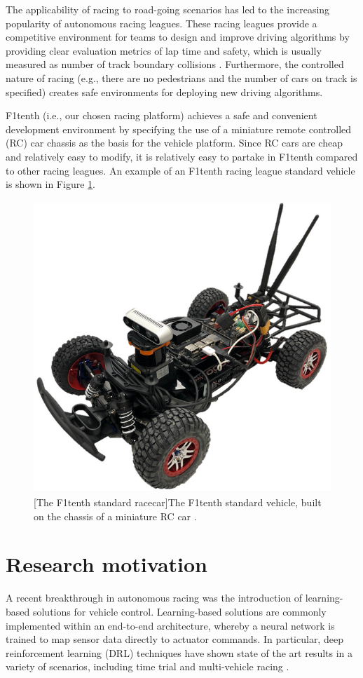 The applicability of racing to road-going scenarios has led to the increasing popularity of autonomous racing leagues.
These racing leagues provide a competitive environment for teams to design and improve driving algorithms by providing clear evaluation metrics of lap time and safety, which is usually measured as number of track boundary collisions \cite{Betz2021}. 
Furthermore, the controlled nature of racing (e.g., there are no pedestrians and the number of cars on track is specified) creates safe environments for deploying new driving algorithms.
 
F1tenth (i.e., our chosen racing platform) achieves a safe and convenient development environment by specifying the use of a miniature remote controlled (RC) car chassis as the basis for the vehicle platform.
Since RC cars are cheap and relatively easy to modify, it is relatively easy to partake in F1tenth compared to other racing leagues.
An example of an F1tenth racing league standard vehicle is shown in Figure \ref{fig:f1tenth_car}.

\begin{figure}[htb]
\centering
  \includegraphics[width=.4\textwidth]{contents/chapt1/figs/f1tenth_car.png}
  [The F1tenth standard racecar]{The F1tenth standard vehicle, built on the chassis of a miniature RC car \cite{f1tenth}.}
  \label{fig:f1tenth_car}
\end{figure}


\section{Research motivation}

A recent breakthrough in autonomous racing was the introduction of learning-based solutions for vehicle control.
Learning-based solutions are commonly implemented within an end-to-end architecture, whereby a neural network is trained to map sensor data directly to actuator commands.
In particular, deep reinforcement learning (DRL) techniques have shown state of the art results in a variety of scenarios, including time trial and multi-vehicle racing \cite{Fuchs2021, Song2021}.

